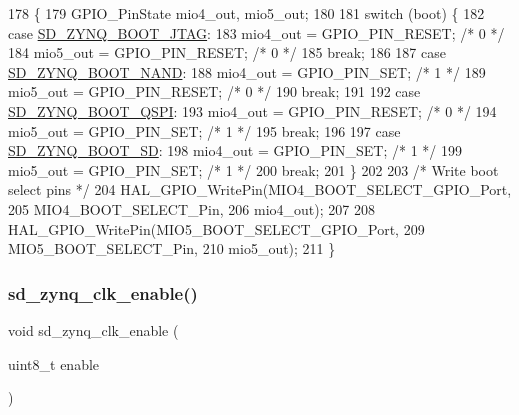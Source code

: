 \begin{DoxyCode}
178 \{
179     GPIO\_PinState mio4\_out, mio5\_out;
180   
181     \textcolor{keywordflow}{switch} (boot) \{
182     \textcolor{keywordflow}{case} \mbox{\hyperlink{group___s_d___platform_gga06667de95c86bfcdef8bcc8ab13cb2d4aa0c510b780474f1292f04a8b7b987a76}{SD\_ZYNQ\_BOOT\_JTAG}}:
183         mio4\_out = GPIO\_PIN\_RESET;      \textcolor{comment}{/* 0 */}
184         mio5\_out = GPIO\_PIN\_RESET;      \textcolor{comment}{/* 0 */}
185         \textcolor{keywordflow}{break};
186     
187     \textcolor{keywordflow}{case} \mbox{\hyperlink{group___s_d___platform_gga06667de95c86bfcdef8bcc8ab13cb2d4ad270040d99cf171dc127ebca46e82c54}{SD\_ZYNQ\_BOOT\_NAND}}:
188         mio4\_out = GPIO\_PIN\_SET;    \textcolor{comment}{/* 1 */}
189         mio5\_out = GPIO\_PIN\_RESET;      \textcolor{comment}{/* 0 */}
190         \textcolor{keywordflow}{break};
191     
192     \textcolor{keywordflow}{case} \mbox{\hyperlink{group___s_d___platform_gga06667de95c86bfcdef8bcc8ab13cb2d4a85166851f8dac48bd3b4261debe97472}{SD\_ZYNQ\_BOOT\_QSPI}}:
193         mio4\_out = GPIO\_PIN\_RESET;      \textcolor{comment}{/* 0 */}
194         mio5\_out = GPIO\_PIN\_SET;    \textcolor{comment}{/* 1 */}
195         \textcolor{keywordflow}{break};
196     
197     \textcolor{keywordflow}{case} \mbox{\hyperlink{group___s_d___platform_gga06667de95c86bfcdef8bcc8ab13cb2d4af1351df506cd9586ffcd35813fa3f5f9}{SD\_ZYNQ\_BOOT\_SD}}:
198         mio4\_out = GPIO\_PIN\_SET;    \textcolor{comment}{/* 1 */}
199         mio5\_out = GPIO\_PIN\_SET;    \textcolor{comment}{/* 1 */}
200         \textcolor{keywordflow}{break};
201     \}
202  
203     \textcolor{comment}{/* Write boot select pins */}
204     HAL\_GPIO\_WritePin(MIO4\_BOOT\_SELECT\_GPIO\_Port,
205               MIO4\_BOOT\_SELECT\_Pin,
206               mio4\_out);
207     
208     HAL\_GPIO\_WritePin(MIO5\_BOOT\_SELECT\_GPIO\_Port, 
209               MIO5\_BOOT\_SELECT\_Pin,
210               mio5\_out);
211 \}
\end{DoxyCode}
\mbox{\label{group___s_d___platform___boot___config_gad7a6663ba74657a3939e7a9701db0454}} 
\subsubsection{\texorpdfstring{sd\+\_\+zynq\+\_\+clk\+\_\+enable()}{sd\_zynq\_clk\_enable()}}
{\footnotesize\ttfamily void sd\+\_\+zynq\+\_\+clk\+\_\+enable (\begin{DoxyParamCaption}\item[{uint8\+\_\+t}]{enable }\end{DoxyParamCaption})}



